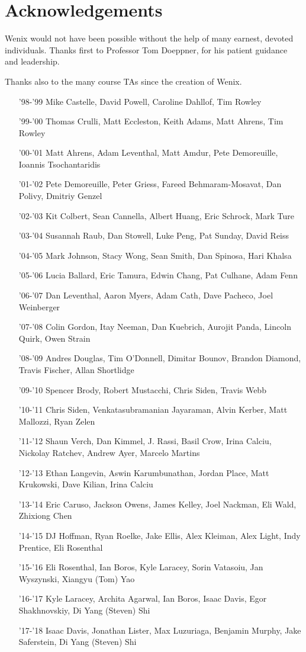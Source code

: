 \section{Acknowledgements}
Wenix would not have been possible without the help of many earnest, devoted individuals. Thanks first to Professor Tom Doeppner, for his patient guidance and leadership.

Thanks also to the many course TAs since the creation of Wenix.
\begin{itemize}
    \item['98-'99] Mike Castelle, David Powell, Caroline Dahllof, Tim Rowley
    \item['99-'00] Thomas Crulli, Matt Eccleston, Keith Adams, Matt Ahrens, Tim Rowley
    \item['00-'01] Matt Ahrens, Adam Leventhal, Matt Amdur, Pete Demoreuille, Ioannis Tsochantaridis
    \item['01-'02] Pete Demoreuille, Peter Griess, Fareed Behmaram-Mosavat, Dan Polivy, Dmitriy Genzel
    \item['02-'03] Kit Colbert, Sean Cannella, Albert Huang, Eric Schrock, Mark Ture
    \item['03-'04] Susannah Raub, Dan Stowell, Luke Peng, Pat Sunday, David Reiss
    \item['04-'05] Mark Johnson, Stacy Wong, Sean Smith, Dan Spinosa, Hari Khalsa
    \item['05-'06] Lucia Ballard, Eric Tamura, Edwin Chang, Pat Culhane, Adam Fenn
    \item['06-'07] Dan Leventhal, Aaron Myers, Adam Cath, Dave Pacheco, Joel Weinberger
    \item['07-'08] Colin Gordon, Itay Neeman, Dan Kuebrich, Aurojit Panda, Lincoln Quirk, Owen Strain
    \item['08-'09] Andres Douglas, Tim O'Donnell, Dimitar Bounov, Brandon Diamond, Travis Fischer, Allan Shortlidge
    \item['09-'10] Spencer Brody, Robert Mustacchi, Chris Siden, Travis Webb
    \item['10-'11] Chris Siden, Venkatasubramanian Jayaraman, Alvin Kerber, Matt Mallozzi, Ryan Zelen
    \item['11-'12] Shaun Verch, Dan Kimmel, J. Rassi, Basil Crow, Irina	Calciu, Nickolay Ratchev, Andrew Ayer, Marcelo Martins
    \item['12-'13] Ethan Langevin, Aswin Karumbunathan, Jordan Place, Matt Krukowski, Dave Kilian, Irina Calciu
    \item['13-'14] Eric Caruso, Jackson Owens, James Kelley, Joel Nackman, Eli Wald, Zhixiong Chen
    \item['14-'15] DJ Hoffman, Ryan Roelke, Jake Ellis, Alex Kleiman, Alex Light, Indy Prentice, Eli Rosenthal
    \item['15-'16] Eli Rosenthal, Ian Boros, Kyle Laracey, Sorin Vatasoiu, Jan Wyszynski, Xiangyu (Tom) Yao
    \item['16-'17] Kyle Laracey, Archita Agarwal, Ian Boros, Isaac Davis, Egor Shakhnovskiy, Di Yang (Steven) Shi
    \item['17-'18] Isaac Davis, Jonathan Lister, Max Luzuriaga, Benjamin Murphy, Jake Saferstein, Di Yang (Steven) Shi
\end{itemize}
